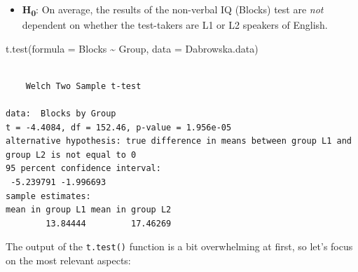 \documentclass[
  letterpaper,
  DIV=11,
  numbers=noendperiod]{scrreprt}
\newenvironment{Shaded}{\begin{snugshade}}{\end{snugshade}}
\newcommand{\AttributeTok}[1]{\textcolor[rgb]{0.40,0.45,0.13}{#1}}
\newcommand{\FunctionTok}[1]{\textcolor[rgb]{0.28,0.35,0.67}{#1}}
\newcommand{\NormalTok}[1]{\textcolor[rgb]{0.00,0.23,0.31}{#1}}
\newcommand{\SpecialCharTok}[1]{\textcolor[rgb]{0.37,0.37,0.37}{#1}}
\providecommand{\tightlist}{%
  \setlength{\itemsep}{0pt}\setlength{\parskip}{0pt}}
\begin{document}
\begin{itemize}
\tightlist
\item
  \textbf{H\textsubscript{0}}: On average, the results of the non-verbal
  IQ (Blocks) test are \emph{not} dependent on whether the test-takers
  are L1 or L2 speakers of English.
\end{itemize}

\begin{Shaded}
\begin{Highlighting}[]
\FunctionTok{t.test}\NormalTok{(}\AttributeTok{formula =}\NormalTok{ Blocks }\SpecialCharTok{\textasciitilde{}}\NormalTok{ Group, }
       \AttributeTok{data =}\NormalTok{ Dabrowska.data)}
\end{Highlighting}
\end{Shaded}

\begin{verbatim}

    Welch Two Sample t-test

data:  Blocks by Group
t = -4.4084, df = 152.46, p-value = 1.956e-05
alternative hypothesis: true difference in means between group L1 and group L2 is not equal to 0
95 percent confidence interval:
 -5.239791 -1.996693
sample estimates:
mean in group L1 mean in group L2 
        13.84444         17.46269 
\end{verbatim}

The output of the \texttt{t.test()} function is a bit overwhelming at
first, so let's focus on the most relevant aspects:
\end{document}
